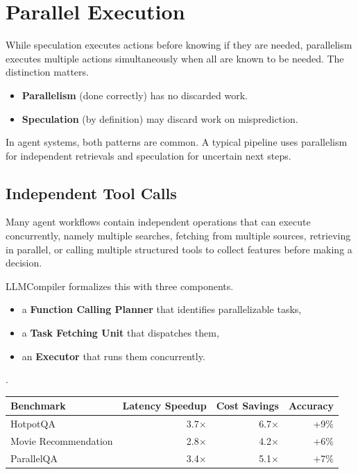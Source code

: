 \section{Parallel Execution}

While speculation executes actions before knowing if they are needed, parallelism executes multiple actions simultaneously when all are known to be needed. The distinction matters.

\begin{itemize}
\item \textbf{Parallelism} (done correctly) has no discarded work.
\item \textbf{Speculation} (by definition) may discard work on misprediction.
\end{itemize}

In agent systems, both patterns are common. A typical pipeline uses parallelism for independent retrievals and speculation for uncertain next steps.

\subsection{Independent Tool Calls}

Many agent workflows contain independent operations that can execute concurrently, namely multiple searches, fetching from multiple sources, retrieving in parallel, or calling multiple structured tools to collect features before making a decision.

LLMCompiler \cite{kim2024llmcompiler} formalizes this with three components.
\begin{itemize}
\item a \textbf{Function Calling Planner} that identifies parallelizable tasks,
\item a \textbf{Task Fetching Unit} that dispatches them,
\item an \textbf{Executor} that runs them concurrently.
\end{itemize}.

\begin{center}
\begin{tabular}{lrrr}
\toprule
Benchmark & Latency Speedup & Cost Savings & Accuracy \\
\midrule
HotpotQA & 3.7$\times$ & 6.7$\times$ & +9\% \\
Movie Recommendation & 2.8$\times$ & 4.2$\times$ & +6\% \\
ParallelQA & 3.4$\times$ & 5.1$\times$ & +7\% \\
\bottomrule
\end{tabular}
\end{center}

